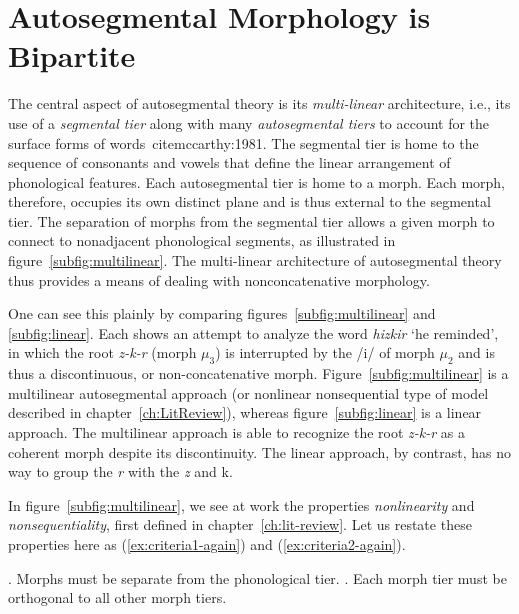 \section{Autosegmental Morphology is Bipartite}\label{sec:autoseg-bipart}
The central aspect of autosegmental theory 
is its \emph{multi-linear} architecture, i.e., its use of a 
\emph{segmental tier} along with many \emph{autosegmental tiers} to 
account for the surface forms of words\ cite{mccarthy:1981}. The segmental tier is home to the sequence of consonants and vowels that define the linear arrangement of phonological features. Each autosegmental tier is home to a morph. Each morph, therefore, occupies its own distinct plane and is thus external to the segmental tier. The separation of morphs from the segmental tier allows a given morph to connect to nonadjacent phonological segments, as illustrated in figure~\ref{subfig:multilinear}. %
The multi-linear architecture of autosegmental theory thus provides a means of
dealing with nonconcatenative morphology. 

One can see this plainly by comparing figures~\ref{subfig:multilinear} and \ref{subfig:linear}. Each shows an attempt to analyze the word \emph{hizkir} `he reminded', in which the root \textit{z-k-r} (morph $\mu_3$) is interrupted by the /i/ of morph $\mu_2$ and is thus a discontinuous, or non-concatenative morph. Figure~\ref{subfig:multilinear} is a multilinear autosegmental approach (or nonlinear nonsequential type of model described in chapter~\ref{ch:LitReview}), whereas figure~\ref{subfig:linear} is a linear approach. The multilinear approach is able to recognize the root \textit{z-k-r} as a coherent morph despite its discontinuity. The linear approach, by contrast, has no way to group the \textit{r} with the \textit{z} and {k}.

In figure~\ref{subfig:multilinear}, we see at work the properties \emph{nonlinearity} and \emph{nonsequentiality}, first defined in chapter~\ref{ch:lit-review}.
Let us restate these properties here as (\ref{ex:criteria1-again}) and (\ref{ex:criteria2-again}).
\begin{exe} \label{ex:criteria-again} \ex \begin{xlist}
	.  %
	Morphs must be separate from the phonological tier. \label{ex:criteria1-again}
	.
	Each morph tier must be orthogonal to all other morph tiers. \label{ex:criteria2-again}
	\end{xlist}
\end{exe}


